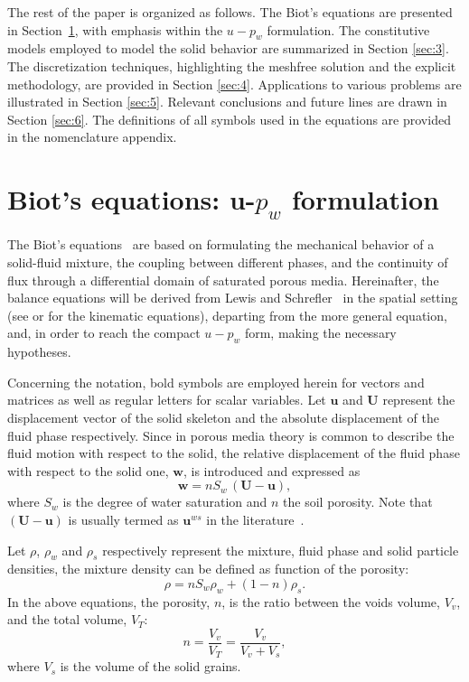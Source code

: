 \documentclass[twocolumn]{svjour3}          %
\begin{document}
The rest of the paper is organized as follows. The Biot's equations are presented in Section~\ref{sec:2}, with emphasis within the $u-p_w$ formulation. The constitutive models employed to model the solid behavior are summarized in Section \ref{sec:3}. The discretization techniques, highlighting the meshfree solution and the explicit methodology, are provided in Section \ref{sec:4}. Applications to various problems are illustrated in Section \ref{sec:5}. Relevant conclusions and future lines are drawn in Section \ref{sec:6}. The definitions of all symbols used in the equations are provided in the nomenclature appendix.    


\section{Biot's equations: u-$p_w$ formulation}
\label{sec:2}

The Biot's equations~\cite{Biot1956} are based on formulating the mechanical behavior of a solid-fluid mixture, the coupling between different phases, and the continuity of flux through a differential domain of saturated porous media. Hereinafter, the balance equations will be derived from Lewis and Schrefler~\cite{LewisSchrefler98} in the spatial setting (see \cite{LewisSchrefler98} or \cite{Sanavia:02b,Sanavia:02} for the kinematic equations), departing from the more general equation, and, in order to reach the compact $u-p_w$ form, making the necessary hypotheses.

Concerning the notation, bold symbols are employed herein for vectors and matrices as well as regular letters for scalar variables.  Let   $\boldsymbol{u}$ and   $\boldsymbol{U}$ represent  the displacement vector of the solid skeleton   and the absolute displacement of the fluid phase respectively. Since in porous media theory is common to describe the fluid motion with respect to the solid, the
relative displacement of the fluid phase with respect to the solid one, $\boldsymbol{w}$, is introduced and expressed as~\cite{LopezQuerol2008}
\begin{equation}\label{eq_uw1}
\boldsymbol{ w }=n S_w\, \boldsymbol{  \left(U-u\right) },
\end{equation}
where $S_w$ is the degree of water saturation and $n$ the soil porosity.  Note that $\boldsymbol{  \left(U-u\right) }$ is usually  termed as $\boldsymbol{u}^{ws}$ in the literature~\cite{LewisSchrefler98}. 

Let $\rho$, $\rho_{w}$ and $\rho_{s}$ respectively represent the mixture, fluid phase and solid particle densities,   the mixture density can be  defined as function of the porosity:
\begin{equation}\label{eq_uw2}
\rho=n S_w \rho_{w}+(1-n) \rho_s.
\end{equation}
In the above equations, the porosity, $n$, is the ratio  between the voids volume, $V_v$, and the total volume, $V_T$:
\begin{equation}\label{eq_uw3}
n=\frac{V_v}{V_T}=\frac{V_v}{V_v+V_s},
\end{equation}
where $V_s$ is the volume of the solid grains.
\end{document}
